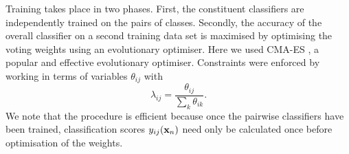 Training takes place in two phases.  First, the constituent classifiers are independently trained on the pairs of classes.  Secondly, the accuracy of the overall classifier on a second training data set is maximised by optimising the voting weights using an evolutionary optimiser.  Here we used CMA-ES \citep{hansen2006eda}, a popular and effective evolutionary optimiser.  Constraints were enforced by working in terms of variables $\theta_{ij}$ with
\begin{equation}
\lambda_{ij} = \frac{\theta_{ij} }{ \sum_{k}
	\theta_{ik}}.
\end{equation}
We note that the procedure is efficient because once the pairwise classifiers have been trained, classification scores $y_{ij}(\mathbf{x}_n)$ need only be calculated once before optimisation of the weights.

